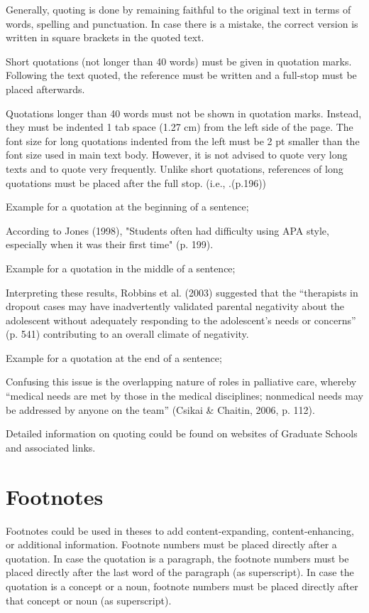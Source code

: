 Generally, quoting is done by remaining faithful to the original text in terms of words, spelling and punctuation. In case there is a mistake, the correct version is written in square brackets in the quoted text.

Short quotations (not longer than 40 words) must be given in quotation marks. Following the text quoted, the reference must be written and a full-stop must be placed afterwards.  

Quotations longer than 40 words must not be shown in quotation  marks. Instead, they must be indented 1 tab space (1.27 cm) from the left side of the page. The font size for long quotations indented from the left must be 2 pt smaller than the font size used in main text body. However, it is not advised to quote very long texts and to quote very frequently. Unlike short quotations, references of long quotations must be placed after the full stop. (i.e., .(p.196))

Example for a quotation at the beginning of a sentence;

According to Jones (1998), "Students often had difficulty using APA style,  especially when it was their first time" (p. 199).

Example for a quotation in the middle of a sentence;

Interpreting these results, Robbins et al. (2003) suggested that the “therapists in dropout cases may have inadvertently validated parental negativity about the adolescent without adequately responding to the adolescent’s needs or concerns” (p. 541) contributing to an overall climate of negativity.

Example for a quotation at the end of a sentence;

Confusing this issue is the overlapping nature of roles in palliative care, whereby “medical needs are met by those in the medical disciplines; nonmedical needs may be addressed by anyone on the team” (Csikai \& Chaitin, 2006, p. 112). 

Detailed information on quoting could be found on websites of Graduate Schools and associated links.

\section{Footnotes}

Footnotes could be used in theses to add content-expanding, content-enhancing, or additional information. 
Footnote numbers must be placed directly after a quotation. In case the quotation is a paragraph, the footnote numbers must be placed directly after the last word of the paragraph (as superscript). In case the quotation is a concept or a noun, footnote numbers must be placed directly after that concept or noun (as superscript). 

